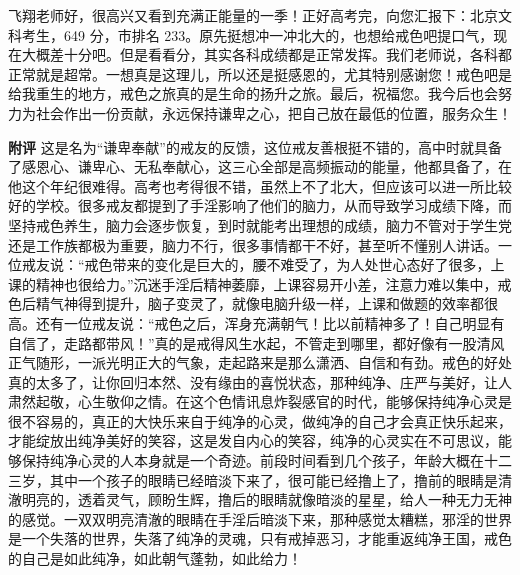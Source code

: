 \begin{case}
    飞翔老师好，很高兴又看到充满正能量的一季！正好高考完，向您汇报下：北京文科考生，649 分，市排名 233。原先挺想冲一冲北大的，也想给戒色吧提口气，现在大概差十分吧。但是看看分，其实各科成绩都是正常发挥。我们老师说，各科都正常就是超常。一想真是这理儿，所以还是挺感恩的，尤其特别感谢您！戒色吧是给我重生的地方，戒色之旅真的是生命的扬升之旅。最后，祝福您。我今后也会努力为社会作出一份贡献，永远保持谦卑之心，把自己放在最低的位置，服务众生！

    \textbf{附评} 这是名为“谦卑奉献”的戒友的反馈，这位戒友善根挺不错的，高中时就具备了感恩心、谦卑心、无私奉献心，这三心全部是高频振动的能量，他都具备了，在他这个年纪很难得。高考也考得很不错，虽然上不了北大，但应该可以进一所比较好的学校。很多戒友都提到了手淫影响了他们的脑力，从而导致学习成绩下降，而坚持戒色养生，脑力会逐步恢复，到时就能考出理想的成绩，脑力不管对于学生党还是工作族都极为重要，脑力不行，很多事情都干不好，甚至听不懂别人讲话。一位戒友说：“戒色带来的变化是巨大的，腰不难受了，为人处世心态好了很多，上课的精神也很给力。”沉迷手淫后精神萎靡，上课容易开小差，注意力难以集中，戒色后精气神得到提升，脑子变灵了，就像电脑升级一样，上课和做题的效率都很高。还有一位戒友说：“戒色之后，浑身充满朝气！比以前精神多了！自己明显有自信了，走路都带风！”真的是戒得风生水起，不管走到哪里，都好像有一股清风正气随形，一派光明正大的气象，走起路来是那么潇洒、自信和有劲。戒色的好处真的太多了，让你回归本然、没有缘由的喜悦状态，那种纯净、庄严与美好，让人肃然起敬，心生敬仰之情。在这个色情讯息炸裂感官的时代，能够保持纯净心灵是很不容易的，真正的大快乐来自于纯净的心灵，做纯净的自己才会真正快乐起来，才能绽放出纯净美好的笑容，这是发自内心的笑容，纯净的心灵实在不可思议，能够保持纯净心灵的人本身就是一个奇迹。前段时间看到几个孩子，年龄大概在十二三岁，其中一个孩子的眼睛已经暗淡下来了，很可能已经撸上了，撸前的眼睛是清澈明亮的，透着灵气，顾盼生辉，撸后的眼睛就像暗淡的星星，给人一种无力无神的感觉。一双双明亮清澈的眼睛在手淫后暗淡下来，那种感觉太糟糕，邪淫的世界是一个失落的世界，失落了纯净的灵魂，只有戒掉恶习，才能重返纯净王国，戒色的自己是如此纯净，如此朝气蓬勃，如此给力！
\end{case}


